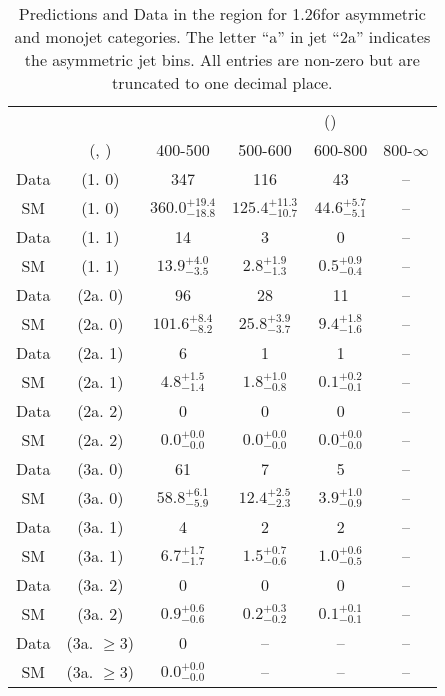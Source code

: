 \begin{table}[h!]
\tiny
\centering
\caption{Predictions and Data in the \gj region for 1.26\ifb for asymmetric and monojet categories. The letter ``a'' in jet \eg ``2a''  indicates the asymmetric jet bins. All entries are non-zero but are truncated to one decimal place.\label{tab:predall_gj_comb_asym}}
\begin{tabular}
{cccccc}
	\hline\hline
&	&	& \multicolumn{4}{c}{\scalht (\gev)}\\ 
	&	 (\njet, \nb) & 400-500 & 500-600 & 600-800 & 800-$\infty$ \\ [0.8ex] 
\hline
	Data & (1. 0) & 347 & 116 & 43 & -- \\[0.5ex] 
	SM & (1. 0) & $360.0^{+ 19.4 }_{- 18.8 }$ & $125.4^{+ 11.3 }_{- 10.7 }$ & $44.6^{+ 5.7 }_{- 5.1 }$ & -- \\[0.5ex] 
	Data & (1. 1) & 14 & 3 & 0 & -- \\[0.5ex] 
	SM & (1. 1) & $13.9^{+ 4.0 }_{- 3.5 }$ & $2.8^{+ 1.9 }_{- 1.3 }$ & $0.5^{+ 0.9 }_{- 0.4 }$ & -- \\[0.5ex] 
	Data & (2a. 0) & 96 & 28 & 11 & -- \\[0.5ex] 
	SM & (2a. 0) & $101.6^{+ 8.4 }_{- 8.2 }$ & $25.8^{+ 3.9 }_{- 3.7 }$ & $9.4^{+ 1.8 }_{- 1.6 }$ & -- \\[0.5ex] 
	Data & (2a. 1) & 6 & 1 & 1 & -- \\[0.5ex] 
	SM & (2a. 1) & $4.8^{+ 1.5 }_{- 1.4 }$ & $1.8^{+ 1.0 }_{- 0.8 }$ & $0.1^{+ 0.2 }_{- 0.1 }$ & -- \\[0.5ex] 
	Data & (2a. 2) & 0 & 0 & 0 & -- \\[0.5ex] 
	SM & (2a. 2) & $0.0^{+ 0.0 }_{- 0.0 }$ & $0.0^{+ 0.0 }_{- 0.0 }$ & $0.0^{+ 0.0 }_{- 0.0 }$ & -- \\[0.5ex] 
	Data & (3a. 0) & 61 & 7 & 5 & -- \\[0.5ex] 
	SM & (3a. 0) & $58.8^{+ 6.1 }_{- 5.9 }$ & $12.4^{+ 2.5 }_{- 2.3 }$ & $3.9^{+ 1.0 }_{- 0.9 }$ & -- \\[0.5ex] 
	Data & (3a. 1) & 4 & 2 & 2 & -- \\[0.5ex] 
	SM & (3a. 1) & $6.7^{+ 1.7 }_{- 1.7 }$ & $1.5^{+ 0.7 }_{- 0.6 }$ & $1.0^{+ 0.6 }_{- 0.5 }$ & -- \\[0.5ex] 
	Data & (3a. 2) & 0 & 0 & 0 & -- \\[0.5ex] 
	SM & (3a. 2) & $0.9^{+ 0.6 }_{- 0.6 }$ & $0.2^{+ 0.3 }_{- 0.2 }$ & $0.1^{+ 0.1 }_{- 0.1 }$ & -- \\[0.5ex] 
	Data & (3a. $\ge3$) & 0 & -- & -- & -- \\[0.5ex] 
	SM & (3a. $\ge3$) & $0.0^{+ 0.0 }_{- 0.0 }$ & -- & -- & -- \\[0.5ex] 

\end{tabular}
\end{table}
